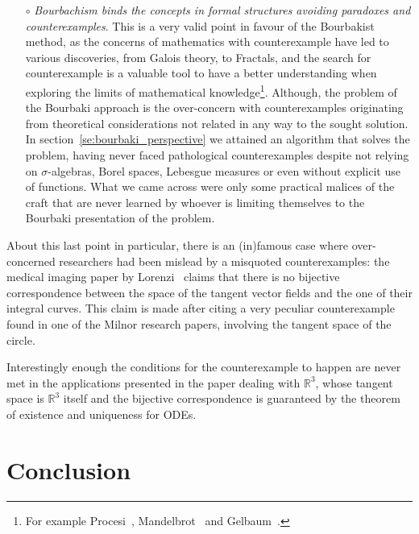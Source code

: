 \documentclass[]{scrartcl}
\theoremstyle{definition}
\begin{document}
\begin{itemize}
    \item[$\circ$] \emph{Bourbachism binds the concepts in formal structures avoiding paradoxes and counterexamples}. This is a very valid point in favour of the Bourbakist method, as the concerns of mathematics with counterexample have led to various discoveries, from Galois theory, to Fractals, and the search for counterexample is a valuable tool to have a better understanding when exploring the limits of mathematical knowledge\footnote{
        For example Procesi~\cite{procesi1977elementi}, Mandelbrot~\cite{mandelbrot1983fractal} and Gelbaum~\cite{gelbaum2003counterexamples}.
    }. Although, the problem of the Bourbaki approach is the over-concern with counterexamples originating from theoretical considerations not related in any way to the sought solution. In section~\ref{se:bourbaki_perspective} we attained an algorithm that solves the problem, having never faced pathological counterexamples despite not relying on $\sigma$-algebras, Borel spaces, Lebesgue measures or even without explicit use of functions. What we came across were only some practical malices of the craft that are never learned by whoever is limiting themselves to the Bourbaki presentation of the problem.

\end{itemize}

About this last point in particular, there is an (in)famous case where over-concerned researchers had been mislead by a misquoted counterexamples: the medical imaging paper by Lorenzi~\cite{lorenzi2013geodesics} claims that there is no bijective correspondence between the space of the tangent vector fields and the one of their integral curves. This claim is made after citing a very peculiar counterexample found in one of the Milnor research papers, involving the tangent space of the circle.

Interestingly enough the conditions for the counterexample to happen are never met in the applications presented in the paper dealing with $\mathbb{R}^3$, whose tangent space is $\mathbb{R}^3$ itself and the bijective correspondence is guaranteed by the theorem of existence and uniqueness for ODEs.


\section{Conclusion}
\end{document}
